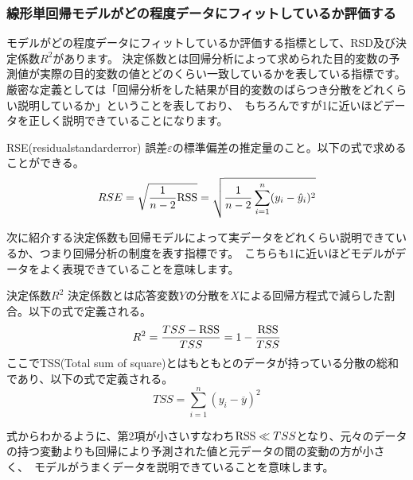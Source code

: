 \documentclass[uplatex]{jsarticle}
\begin{document}
\subsubsection{線形単回帰モデルがどの程度データにフィットしているか評価する}
モデルがどの程度データにフィットしているか評価する指標として、RSD及び決定係数$R^2$があります。
決定係数とは回帰分析によって求められた目的変数の予測値が実際の目的変数の値とどのくらい一致しているかを表している指標です。厳密な定義としては「回帰分析をした結果が目的変数のばらつき分散をどれくらい説明しているか」ということを表しており、\
もちろんですが1に近いほどデータを正しく説明できていることになります。
\begin{itembox}[l]{RSE(residualstandarderror)}
  誤差$\varepsilon$の標準偏差の推定量のこと。以下の式で求めることができる。
  $$RSE = \sqrt{\frac{1}{n-2}{\rm RSS}} = \sqrt{\frac{1}{n-2}\sum_{i=1}^n(y_i - \hat{y}_i)^2}$$
\end{itembox}
次に紹介する決定係数も回帰モデルによって実データをどれくらい説明できているか、つまり回帰分析の制度を表す指標です。\
こちらも1に近いほどモデルがデータをよく表現できていることを意味します。
\begin{itembox}[l]{決定係数$R^2$}
  決定係数とは応答変数$Y$の分散を$X$による回帰方程式で減らした割合。以下の式で定義される。
  $$R^2 = \frac{TSS - {\rm RSS}}{TSS} = 1 - \frac{{\rm RSS}}{TSS}$$
  ここでTSS(Total sum of square)とはもともとのデータが持っている分散の総和であり、以下の式で定義される。
  $$TSS = \sum_{i=1}^n (y_i - \overline{y})^2$$
\end{itembox}
式からわかるように、第2項が小さいすなわち${\rm RSS} \ll TSS$となり、元々のデータの持つ変動よりも回帰により予測された値と元データの間の変動の方が小さく、\
モデルがうまくデータを説明できていることを意味します。
\end{document}
